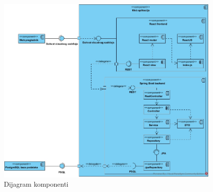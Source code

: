 			\begin{figure}[H]
				\includegraphics[width=\textwidth]{slike/dijagramKomponenti.jpg} %
				\caption{Dijagram komponenti}
				\label{fig:dijagramKomponenti} %
			\end{figure}
			
			
			
			
			
			
			
			
			
			
			
			
			